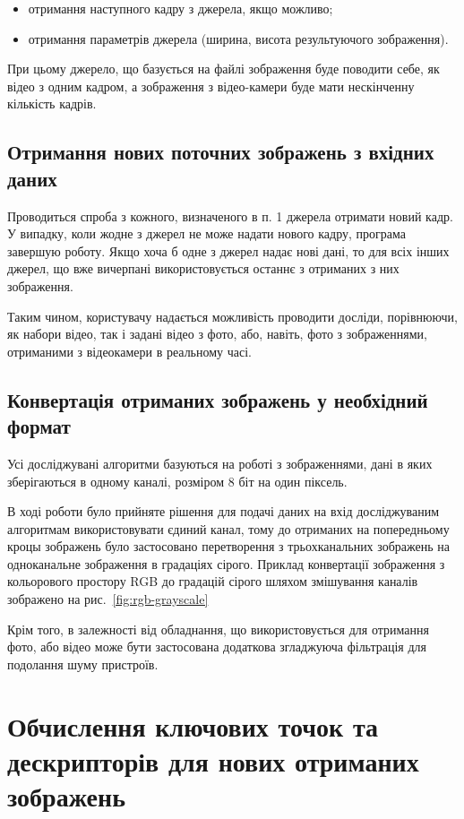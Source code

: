 \begin{itemize}
  \item отримання наступного кадру з джерела, якщо можливо;
  \item отримання параметрів джерела (ширина, висота результуючого зображення).
\end{itemize}
При цьому джерело, що базується на файлі зображення буде поводити себе, як відео з одним кадром, а зображення з відео-камери буде мати нескінченну кількість кадрів. 

\subsection{Отримання нових поточних зображень з вхідних даних}
Проводиться спроба з кожного, визначеного в п. 1 джерела отримати новий кадр. У випадку, коли жодне з джерел не може надати нового кадру, програма завершую роботу. Якщо хоча б одне з джерел надає нові дані, то для всіх інших джерел, що вже вичерпані використовується останнє з отриманих з них зображення. 

Таким чином, користувачу надається можливість проводити досліди, порівнюючи, як набори відео, так і задані відео з фото, або, навіть, фото з зображеннями, отриманими з відеокамери в реальному часі. 

\subsection{Конвертація отриманих зображень у необхідний формат}
Усі досліджувані алгоритми базуються на роботі з зображеннями, дані в яких зберігаються в одному каналі, розміром 8 біт на один піксель. 

В ході роботи було прийняте рішення для подачі даних на вхід досліджуваним алгоритмам використовувати єдиний канал, тому до отриманих на попередньому кроцы зображень було застосовано перетворення з трьохканальних зображень на одноканальне зображення в градаціях сірого. Приклад конвертації зображення з кольорового простору RGB до градацій сірого шляхом змішування каналів зображено на рис.~\ref{fig:rgb-grayscale}


Крім того, в залежності від обладнання, що використовується для отримання фото, або відео може бути застосована додаткова згладжуюча фільтрація для подолання шуму пристроїв. 

\section{Обчислення ключових точок та дескрипторів для нових отриманих зображень}

